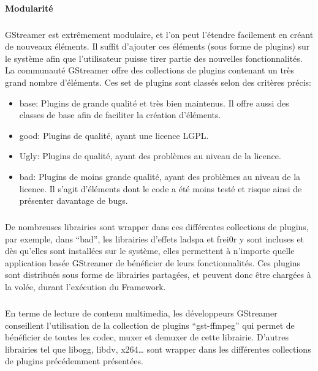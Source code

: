 \paragraph {Modularité}

\subparagraph{}

GStreamer est extrêmement modulaire, et l'on peut l'étendre facilement
en créant de nouveaux éléments. Il suffit d'ajouter ces éléments
(sous forme de plugins) sur le système afin que l'utilisateur puisse
tirer partie des nouvelles fonctionnalités. La communauté GStreamer
offre des collections de plugins contenant un très grand nombre
d'éléments. Ces set de plugins sont classés selon des critères
précis:

\begin{itemize}

  \item {base: Plugins de grande qualité et très bien maintenus. Il
  offre aussi des classes de base afin de faciliter la création
  d'éléments.}

  \item {good: Plugins de qualité, ayant une licence LGPL}.

  \item {Ugly: Plugins de qualité, ayant des problèmes au niveau de
  la licence.}

  \item {bad: Plugins de moins grande qualité, ayant des problèmes
  au niveau
    de la licence. Il s'agit d'éléments dont le code a été moins
    testé et risque ainsi de présenter davantage de bugs.}

\end{itemize}

\subparagraph{}

De nombreuses librairies sont wrapper dans ces différentes collections
de plugins, par exemple, dans ``bad'', les librairies d'effets ladspa et
frei0r y sont incluses et dès qu'elles sont installées sur le système,
elles permettent à n'importe quelle application basée GStreamer de
bénéficier de leurs fonctionnalités.  Ces plugins sont distribués
sous forme de librairies partagées, et peuvent donc être chargées à
la volée, durant l'exécution du Framework.

\subparagraph{}

En terme de lecture de contenu multimedia, les développeurs GStreamer
conseillent l'utilisation de la collection de plugins ``gst-ffmpeg''
qui permet de bénéficier de toutes les codec, muxer et demuxer de
cette librairie. D'autres librairies tel que libogg, libdv, x264\ldots
sont wrapper dans les différentes collections de plugins précédemment
présentées.

